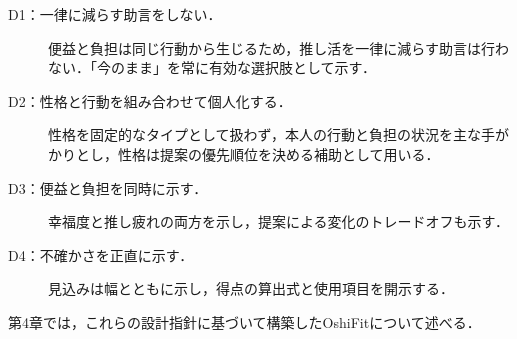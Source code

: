 \begin{description}
\item[D1：一律に減らす助言をしない．]便益と負担は同じ行動から生じるため，推し活を一律に減らす助言は行わない．「今のまま」を常に有効な選択肢として示す．
\item[D2：性格と行動を組み合わせて個人化する．]性格を固定的なタイプとして扱わず，本人の行動と負担の状況を主な手がかりとし，性格は提案の優先順位を決める補助として用いる．
\item[D3：便益と負担を同時に示す．]幸福度と推し疲れの両方を示し，提案による変化のトレードオフも示す．
\item[D4：不確かさを正直に示す．]見込みは幅とともに示し，得点の算出式と使用項目を開示する．
\end{description}

第4章では，これらの設計指針に基づいて構築したOshiFitについて述べる．
